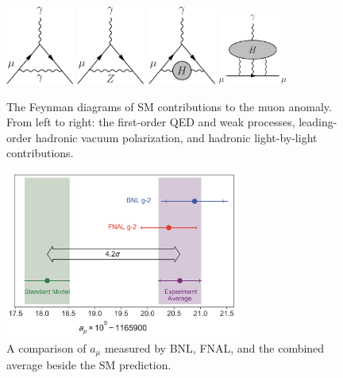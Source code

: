 \begin{figure}[H]
    \centering
    \includegraphics[width=0.2\textwidth]{Images/Muon_gminus2_photon.pdf}\hspace{0.05\textwidth}
    \includegraphics[width=0.2\textwidth]{Images/Muon_gminus2_Z.pdf}\hspace{0.05\textwidth}
    \includegraphics[width=0.2\textwidth]{Images/Muon_gminus2_Hadronic.pdf}\hspace{0.05\textwidth}
    \includegraphics[width=0.2\textwidth]{Images/Muon_gminus2_Hadronic2.pdf}
    \caption{The Feynman diagrams of SM contributions to the muon anomaly. From left to right: the first-order QED and weak processes, leading-order hadronic vacuum polarization, and hadronic light-by-light contributions.}
    \label{fig:amu}
\end{figure}

\begin{figure}[H]
    \centering
    \includegraphics[width=0.7\textwidth]{Images/MuonAnomaly.png}
    \caption{A comparison of $a_\mu$ measured by BNL, FNAL, and the combined average beside the SM prediction.}
    \label{fig:amuExp}
\end{figure}

